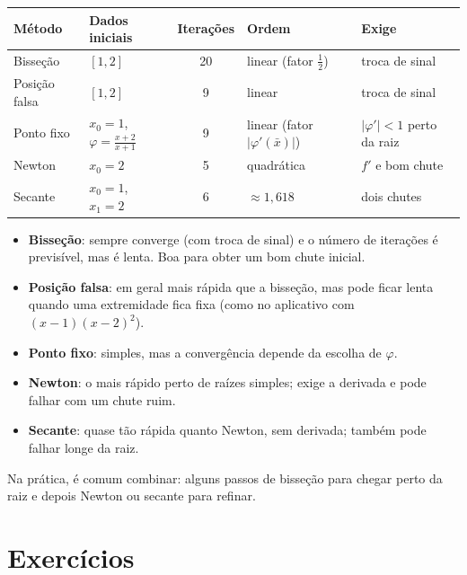 \begin{center}
\begin{tabular}{>{\raggedright\arraybackslash}p{2.6cm}>{\raggedright\arraybackslash}p{3.3cm}c>{\raggedright\arraybackslash}p{2.6cm}>{\raggedright\arraybackslash}p{3.4cm}}
\toprule
Método & Dados iniciais & Iterações & Ordem & Exige\\
\midrule
Bisseção & $[1,2]$ & 20 & linear (fator $\frac12$) & troca de sinal\\
Posição falsa & $[1,2]$ & 9 & linear & troca de sinal\\
Ponto fixo & $x_0=1$, $\varphi=\frac{x+2}{x+1}$ & 9 & linear (fator $|\varphi'(\bar x)|$) & $|\varphi'|<1$ perto da raiz\\
Newton & $x_0=2$ & 5 & quadrática & $f'$ e bom chute\\
Secante & $x_0=1$, $x_1=2$ & 6 & $\approx1{,}618$ & dois chutes\\
\bottomrule
\end{tabular}
\end{center}

\begin{itemize}[nosep]
  \item \textbf{Bisseção}: sempre converge (com troca de sinal) e o número de iterações é
        previsível, mas é lenta. Boa para obter um bom chute inicial.
  \item \textbf{Posição falsa}: em geral mais rápida que a bisseção, mas pode ficar lenta quando
        uma extremidade fica fixa (como no aplicativo com $(x-1)(x-2)^2$).
  \item \textbf{Ponto fixo}: simples, mas a convergência depende da escolha de $\varphi$.
  \item \textbf{Newton}: o mais rápido perto de raízes simples; exige a derivada e pode falhar com
        um chute ruim.
  \item \textbf{Secante}: quase tão rápida quanto Newton, sem derivada; também pode falhar longe da
        raiz.
\end{itemize}
Na prática, é comum combinar: alguns passos de bisseção para chegar perto da raiz e depois
Newton ou secante para refinar.



\section{Exercícios}

